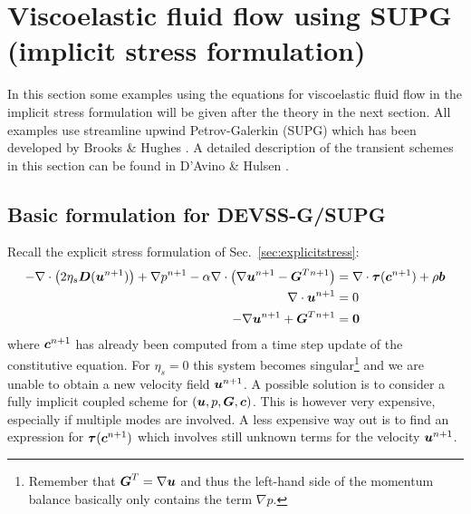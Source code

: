 
\def\headdate{14th February 2021}

\section{Viscoelastic fluid flow using SUPG (implicit stress formulation)}
\label{sec:implicitstress}

In this section some examples using the equations for viscoelastic fluid flow
in the implicit stress formulation
will be given after the theory in the next section.
All examples use streamline upwind Petrov-Galerkin (SUPG)
which has been developed by Brooks \& Hughes \cite{Brooks82}.
A detailed description of the transient schemes in this section can be found in
D'Avino \& Hulsen \cite{DAvino10}.

\subsection{Basic formulation for DEVSS-G/SUPG}

Recall the explicit stress formulation of Sec.~\ref{sec:explicitstress}:
\begin{align}
      -\nabla\cdot\big(2\eta_s\boldsymbol{D}(\boldsymbol{u}^{n+1})\big) +\nabla p^{n+1} 
  -\alpha\nabla\cdot\big(\nabla\boldsymbol{u}^{n+1} -\boldsymbol{G}^T{}^{n+1} \big)
&=\nabla\cdot\boldsymbol{\tau}(\boldsymbol{c}^{n+1})
        + \rho\boldsymbol{b} \\
     \nabla\cdot\boldsymbol{u}^{n+1}&=0\\
   -\nabla\boldsymbol{u}^{n+1} + \boldsymbol{G}^T{}^{n+1} &= \boldsymbol{0}
\end{align}
where $\boldsymbol{c}^{n+1}$ has already been computed from a time step update of
the constitutive equation. For $\eta_s=0$ this system becomes
singular\footnote{Remember that $\boldsymbol{G}^T=\nabla\boldsymbol{u}$ and thus the left-hand
side of the momentum balance basically only contains the term $\nabla p$.} and
we are unable to obtain a new velocity field $\boldsymbol{u}^{n+1}$. A possible
solution is to consider a fully implicit coupled
scheme for $(\boldsymbol{u},p,\boldsymbol{G},\boldsymbol{c})$. This is however very expensive,
especially if multiple modes are involved. A less expensive way out is to find
an expression for $\boldsymbol{\tau}(\boldsymbol{c}^{n+1})$ which involves still unknown terms
for the velocity $\boldsymbol{u}^{n+1}$.

